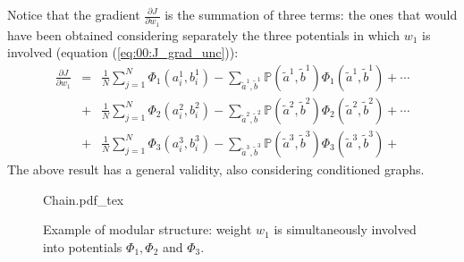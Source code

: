 Notice that the gradient $\frac{\partial J}{\partial w_1}$ is the summation of three terms: the ones that would have been obtained considering separately the three potentials in which $w_1$ is involved (equation (\ref{eq:00:J_grad_unc})):
\begin{eqnarray}
\frac{\partial J}{\partial  w_1} &=&
\frac{1}{N} \sum_{j=1}^{N} \Phi_1(a^1_i, b^1_i) - \sum_{\tilde{a}^1,\tilde{b}^1} \mathbb{P}(\tilde{a}^1,\tilde{b}^1)\Phi_1(\tilde{a}^1,\tilde{b}^1) + \cdots \nonumber\\
 &+& \frac{1}{N} \sum_{j=1}^{N} \Phi_2(a^2_i, b^2_i) - \sum_{\tilde{a}^2,\tilde{b}^2} \mathbb{P}(\tilde{a}^2,\tilde{b}^2)\Phi_2(\tilde{a}^2,\tilde{b}^2) + \cdots \nonumber\\
 &+& \frac{1}{N} \sum_{j=1}^{N} \Phi_3(a^3_i, b^3_i) - \sum_{\tilde{a}^3,\tilde{b}^3} \mathbb{P}(\tilde{a}^3,\tilde{b}^3)\Phi_3(\tilde{a}^3,\tilde{b}^3) +
\end{eqnarray}
The above result has a general validity, also considering conditioned graphs.

\begin{figure}
	\centering
\def\svgwidth{0.95 \columnwidth}
{Chain.pdf_tex} 
	\caption{Example of modular structure: weight $w_1$ is simultaneously involved into potentials $\Phi_1, \Phi_2$ and $\Phi_3$.}
	\label{fig:00:mod_struct}
\end{figure} 